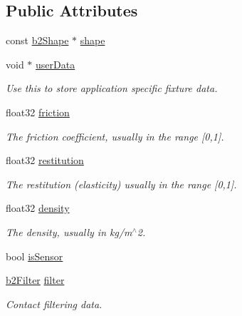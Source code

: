 \subsection*{Public Attributes}
\begin{DoxyCompactItemize}
\item 
const \hyperlink{classb2Shape}{b2\+Shape} $\ast$ \hyperlink{structb2FixtureDef_afd5c15e1a391333566b0e241ed9e9edf}{shape}
\item 
\mbox{\label{structb2FixtureDef_a5a9a25eb921cc0b54f52a6612df09de9}} 
void $\ast$ \hyperlink{structb2FixtureDef_a5a9a25eb921cc0b54f52a6612df09de9}{user\+Data}
\begin{DoxyCompactList}\small\item\em Use this to store application specific fixture data. \end{DoxyCompactList}\item 
\mbox{\label{structb2FixtureDef_a66081c8d0e12d4bdb0b341fb97b46eb6}} 
float32 \hyperlink{structb2FixtureDef_a66081c8d0e12d4bdb0b341fb97b46eb6}{friction}
\begin{DoxyCompactList}\small\item\em The friction coefficient, usually in the range \mbox{[}0,1\mbox{]}. \end{DoxyCompactList}\item 
\mbox{\label{structb2FixtureDef_ad7ee26656e4749f7b548d2cc0cf9f168}} 
float32 \hyperlink{structb2FixtureDef_ad7ee26656e4749f7b548d2cc0cf9f168}{restitution}
\begin{DoxyCompactList}\small\item\em The restitution (elasticity) usually in the range \mbox{[}0,1\mbox{]}. \end{DoxyCompactList}\item 
\mbox{\label{structb2FixtureDef_a6e27d733789a35aa689af2b30a1de0ff}} 
float32 \hyperlink{structb2FixtureDef_a6e27d733789a35aa689af2b30a1de0ff}{density}
\begin{DoxyCompactList}\small\item\em The density, usually in kg/m$^\wedge$2. \end{DoxyCompactList}\item 
bool \hyperlink{structb2FixtureDef_ac8cfcc6208663c92861eaab3b3fdc57e}{is\+Sensor}
\item 
\mbox{\label{structb2FixtureDef_a4c3e493a13d11ab27fcc2eee9f52fd61}} 
\hyperlink{structb2Filter}{b2\+Filter} \hyperlink{structb2FixtureDef_a4c3e493a13d11ab27fcc2eee9f52fd61}{filter}
\begin{DoxyCompactList}\small\item\em Contact filtering data. \end{DoxyCompactList}\end{DoxyCompactItemize}


